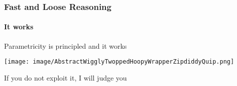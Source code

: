 \begin{frame}[fragile]
\frametitle{Fast and Loose Reasoning}
\framesubtitle{It works}
\begin{center}
Parametricity is principled and it works
\end{center}
\begin{center}
\texttt{[image: image/AbstractWigglyTwoppedHoopyWrapperZipdiddyQuip.png]}
\end{center}
\begin{center}
If you do not exploit it, I will judge you
\end{center}
\end{frame}
